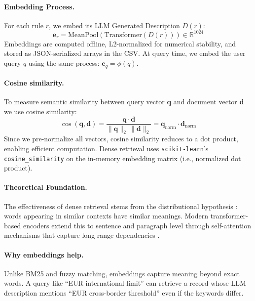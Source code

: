 \paragraph{Embedding Process.} For each rule $r$, we embed its LLM Generated Description $D(r)$:
\[
\mathbf{e}_r = \text{MeanPool}(\text{Transformer}(D(r))) \in \mathbb{R}^{1024}
\]
Embeddings are computed offline, L2-normalized for numerical stability, and stored as JSON-serialized arrays in the CSV. At query time, we embed the user query $q$ using the same process: $\mathbf{e}_q = \phi(q)$.

\paragraph{Cosine similarity.} To measure semantic similarity between query vector $\mathbf{q}$ and document vector $\mathbf{d}$ we use cosine similarity:
\[
\cos(\mathbf{q}, \mathbf{d}) = \frac{\mathbf{q} \cdot \mathbf{d}}{\|\mathbf{q}\|_2 \, \|\mathbf{d}\|_2} = \mathbf{q}_{\text{norm}} \cdot \mathbf{d}_{\text{norm}}
\]
Since we pre-normalize all vectors, cosine similarity reduces to a dot product, enabling efficient computation. Dense retrieval uses \texttt{scikit-learn}'s \texttt{cosine\_similarity} on the in-memory embedding matrix (i.e., normalized dot product).

\paragraph{Theoretical Foundation.} The effectiveness of dense retrieval stems from the distributional hypothesis \cite{harris1954distributional}: words appearing in similar contexts have similar meanings. Modern transformer-based encoders extend this to sentence and paragraph level through self-attention mechanisms that capture long-range dependencies \cite{vaswani2017attention}.

\paragraph{Why embeddings help.} Unlike BM25 and fuzzy matching, embeddings capture meaning beyond exact words. A query like ``EUR international limit'' can retrieve a record whose LLM description mentions ``EUR cross-border threshold'' even if the keywords differ.

